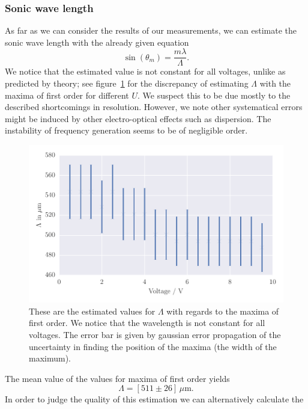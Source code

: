 \subsubsection{Sonic wave length}
As far as we can consider the results of our measurements,
we can estimate the sonic wave length with the already
given equation 
\begin{equation}
\sin(\theta_m) = \frac{m \lambda}{\Lambda}.
\end{equation}
We notice that the estimated value is not constant for all voltages, unlike as predicted by theory; 
see figure~\ref{fig:soundspeed} for the discrepancy of estimating $\Lambda$ with the maxima 
of first order for different $U$.
We suspect this to be due mostly to the described shortcomings in resolution. 
However, we note other systematical errors might be induced by other 
electro-optical effects such as dispersion. The instability of frequency generation
seems to be of negligible order.
\begin{figure}[H]
    \centering
    \includegraphics[width=1\textwidth]{analysis/figures/soundspeed}
    \caption{
        These are the estimated values for $\Lambda$ with regards to the maxima of first order.
        We notice that the wavelength is not constant for all voltages. The error bar is given by
        gaussian error propagation of the uncertainty in finding the position of the maxima (the
        width of the maximum).}
    \label{fig:soundspeed}
\end{figure}
The mean value of the values for maxima of first order yields
\begin{equation}
    \Lambda = \left [511 \pm 26 \right ]\, \mu\mathrm{m}.
\end{equation}
In order to judge the quality of this estimation we can alternatively calculate the
